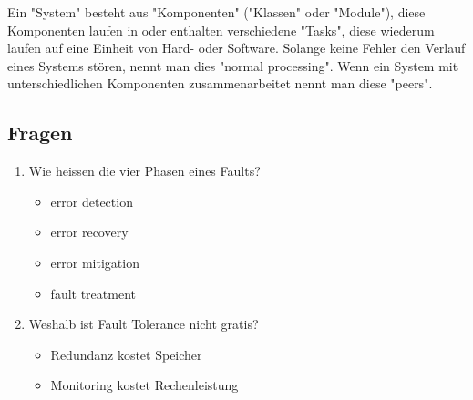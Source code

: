 Ein "System" besteht aus "Komponenten" ("Klassen" oder "Module"), diese Komponenten laufen in oder enthalten verschiedene "Tasks", diese wiederum laufen auf eine Einheit von Hard- oder Software. Solange keine Fehler den Verlauf eines Systems stören, nennt man dies "normal processing". Wenn ein System mit unterschiedlichen Komponenten zusammenarbeitet nennt man diese "peers".



\subsection{Fragen}

\begin{enumerate}
	\item Wie heissen die vier Phasen eines Faults?
	\begin{itemize}
		\item error detection
		\item error recovery
		\item error mitigation
		\item fault treatment
	\end{itemize}

	\item Weshalb ist Fault Tolerance nicht gratis?
	\begin{itemize}
		\item Redundanz kostet Speicher
		\item Monitoring kostet Rechenleistung
	\end{itemize}

\end{enumerate}

